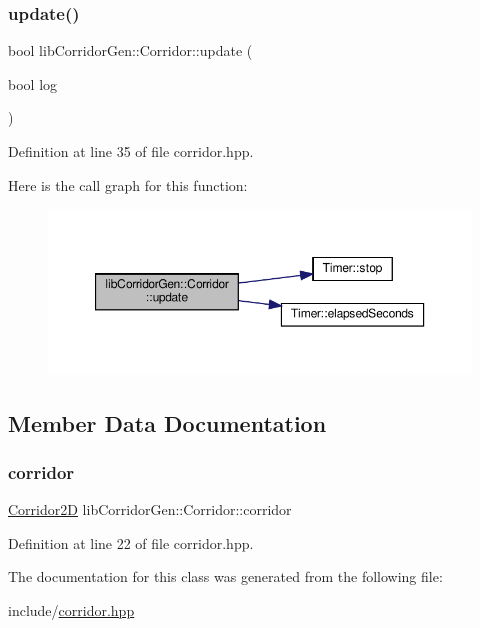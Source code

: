 \subsubsection{\texorpdfstring{update()}{update()}}
{\footnotesize\ttfamily bool lib\+Corridor\+Gen\+::\+Corridor\+::update (\begin{DoxyParamCaption}\item[{bool}]{log }\end{DoxyParamCaption})\hspace{0.3cm}{\ttfamily [inline]}}



Definition at line 35 of file corridor.\+hpp.

Here is the call graph for this function\+:
\nopagebreak
\begin{figure}[H]
\begin{center}
\leavevmode
\includegraphics[width=350pt]{classlib_corridor_gen_1_1_corridor_ac909b465688a8a5e50c6740f20c1b8bd_cgraph}
\end{center}
\end{figure}


\subsection{Member Data Documentation}
\mbox{\label{classlib_corridor_gen_1_1_corridor_af32ca65c896d5c952655106b74ea4666}} 
\subsubsection{\texorpdfstring{corridor}{corridor}}
{\footnotesize\ttfamily \hyperlink{struct_corridor2_d}{Corridor2D} lib\+Corridor\+Gen\+::\+Corridor\+::corridor}



Definition at line 22 of file corridor.\+hpp.



The documentation for this class was generated from the following file\+:\begin{DoxyCompactItemize}
\item 
include/\hyperlink{corridor_8hpp}{corridor.\+hpp}\end{DoxyCompactItemize}
